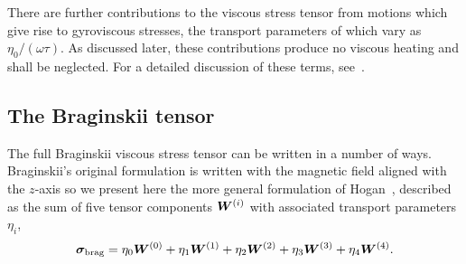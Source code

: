 There are further contributions to the viscous stress tensor from motions which give rise to gyroviscous stresses, the transport parameters of which vary as $\eta_0 / (\omega \tau)$. As discussed later, these contributions produce no viscous heating and shall be neglected. For a detailed discussion of these terms, see~\cite{kaufmanPlasmaViscosityMagnetic1960}.

\subsection{The Braginskii tensor}

\label{sec:braginskii_tensor}

The full Braginskii viscous stress tensor can be written in a number of ways. Braginskii's original formulation is written with the magnetic field aligned with the $z$-axis so we present here the more general formulation of Hogan~\cite{hoganCollisionalTransportMomentum1984}, described as the sum of five tensor components ${\bm W}^{(i)}$ with associated transport parameters $\eta_i$,
\begin{equation}
\label{eq:braginskii_tensor}
{\bm \sigma}_{\text{brag}} = \eta_0 {\bm W}^{(0)} + \eta_1 {\bm W}^{(1)} + \eta_2 {\bm W}^{(2)} + \eta_3 {\bm W}^{(3)} + \eta_4 {\bm W}^{(4)}.
\end{equation}


